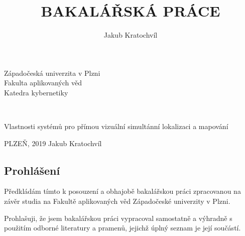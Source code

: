 \documentclass[12pt,a4paper]{article}
\begin{document}
\title{BAKALÁŘSKÁ PRÁCE}
\author{Jakub Kratochvíl}
\begin{titlepage}
\begin{center}
\begin{LARGE}
\vspace*{1cm}
Západočeská univerzita v Plzni \\
Fakulta aplikovaných věd \\
Katedra kybernetiky \\
\end{LARGE}

\vspace{6cm}
\begin{huge}
\textbf{\thetitle}\\
\end{huge}
\vspace{2cm}
\begin{LARGE}
Vlastnosti systémů pro přímou vizuální simultánní lokalizaci a mapování
\end{LARGE}
\end{center}
\vspace{7cm}
\begin{large}
\noindent
PLZEŇ, 2019 \hfill Jakub Kratochvíl

\end{large}

\end{titlepage}
\newpage

\pagestyle{empty}		

\newpage

\newpage
\pagestyle{plain}
\setcounter{page}{1}

\vspace*{1cm}
\subsection*{Prohlášení}

\vspace{2cm}
Předkládám  tímto  k posouzení  a  obhajobě  bakalářskou  práci  zpracovanou  na závěr studia na Fakultě aplikovaných věd Západočeské univerzity v Plzni. \\
\vspace{0.5cm}

\noindent
Prohlašuji,  že  jsem  bakalářskou  práci  vypracoval  samostatně  a  výhradně s použitím odborné literatury a pramenů, jejichž úplný seznam je její součástí. \\
\end{document}
